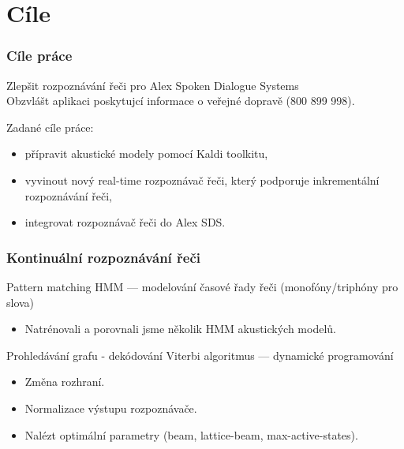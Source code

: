 

\maketitle

\section{Cíle} %

\begin{frame}\frametitle{Cíle práce} 
    Zlepšit rozpoznávání řeči pro Alex Spoken Dialogue Systems \\
    Obzvlášt aplikaci poskytujcí informace o veřejné dopravě (800 899 998).
        \begin{exampleblock}{Zadané cíle práce:}
        \begin{itemize}
            \item přípravit akustické modely pomocí Kaldi toolkitu,
            \item vyvinout nový real-time rozpoznávač řeči, který podporuje inkrementální rozpoznávání řeči,
            \item integrovat rozpoznávač řeči do Alex SDS.
        \end{itemize}
    \end{exampleblock}
\end{frame}

\begin{frame}\frametitle{Kontinuální rozpoznávání řeči} 
    \begin{block}{Pattern matching}
        HMM --- modelování časové řady řeči (monofóny/triphóny pro slova)
        \begin{itemize}
            \item Natrénovali a porovnali jsme několik HMM akustických modelů.
        \end{itemize}
    \end{block}
    \begin{exampleblock}{Prohledávání grafu - dekódování}
        Viterbi algoritmus --- dynamické programování
        \begin{itemize}
            \item Změna rozhraní.
            \item Normalizace výstupu rozpoznávače.
            \item Nalézt optimální parametry (beam, lattice-beam, max-active-states).
        \end{itemize}
    \end{exampleblock}
\end{frame}

